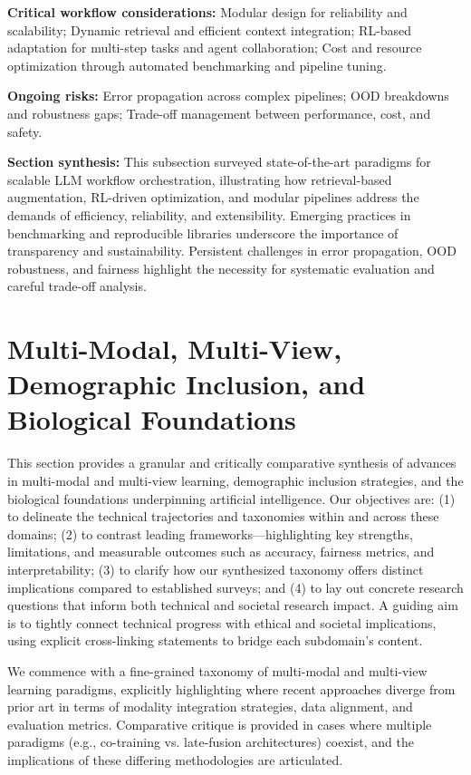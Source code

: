 \documentclass[sigconf]{acmart}
\begin{document}
\textbf{Critical workflow considerations:}
Modular design for reliability and scalability;
Dynamic retrieval and efficient context integration;
RL-based adaptation for multi-step tasks and agent collaboration;
Cost and resource optimization through automated benchmarking and pipeline tuning.

\textbf{Ongoing risks:}
Error propagation across complex pipelines;
OOD breakdowns and robustness gaps;
Trade-off management between performance, cost, and safety.

\textbf{Section synthesis:}
This subsection surveyed state-of-the-art paradigms for scalable LLM workflow orchestration, illustrating how retrieval-based augmentation, RL-driven optimization, and modular pipelines address the demands of efficiency, reliability, and extensibility. Emerging practices in benchmarking and reproducible libraries underscore the importance of transparency and sustainability. Persistent challenges in error propagation, OOD robustness, and fairness highlight the necessity for systematic evaluation and careful trade-off analysis.

\section{Multi-Modal, Multi-View, Demographic Inclusion, and Biological Foundations}

This section provides a granular and critically comparative synthesis of advances in multi-modal and multi-view learning, demographic inclusion strategies, and the biological foundations underpinning artificial intelligence. Our objectives are: (1) to delineate the technical trajectories and taxonomies within and across these domains; (2) to contrast leading frameworks—highlighting key strengths, limitations, and measurable outcomes such as accuracy, fairness metrics, and interpretability; (3) to clarify how our synthesized taxonomy offers distinct implications compared to established surveys; and (4) to lay out concrete research questions that inform both technical and societal research impact. A guiding aim is to tightly connect technical progress with ethical and societal implications, using explicit cross-linking statements to bridge each subdomain's content.

We commence with a fine-grained taxonomy of multi-modal and multi-view learning paradigms, explicitly highlighting where recent approaches diverge from prior art in terms of modality integration strategies, data alignment, and evaluation metrics. Comparative critique is provided in cases where multiple paradigms (e.g., co-training vs. late-fusion architectures) coexist, and the implications of these differing methodologies are articulated. 
\end{document}
